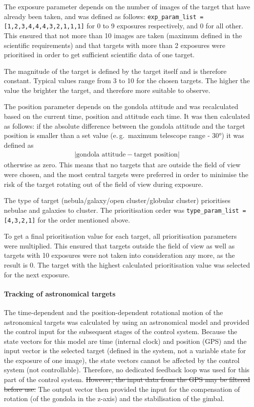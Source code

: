 The exposure parameter depends on the number of images of the target that have already been taken, and was defined as follows: \texttt{exp\_param\_list = [1,2,3,4,4,4,3,2,1,1,1]} for 0 to 9 exposures respectively, and 0 for all other. This ensured that not more than 10 images are taken (maximum defined in the scientific requirements) and that targets with more than 2 exposures were prioritised in order to get sufficient scientific data of one target.

The magnitude of the target is defined by the target itself and is therefore constant. Typical values range from 3 to 10 for the chosen targets. The higher the value the brighter the target, and therefore more suitable to observe.

The position parameter depends on the gondola attitude and was recalculated based on the current time, position and attitude each time. It was then calculated as follows: if the absolute difference between the gondola attitude and the target position is smaller than a set value (e.\,g.~maximum telescope range - $\ang{30}$) it was defined as 
\begin{align*}
	\left|\text{gondola attitude} - \text{target position} \right|
\end{align*}
otherwise as zero. This means that no targets that are outside the field of view were chosen, and the most central targets were preferred in order to minimise the risk of the target rotating out of the field of view during exposure.

The type of target (nebula/galaxy/open cluster/globular cluster) prioritises nebulae and galaxies to cluster. The prioritisation order was \texttt{type\_param\_list = [4,3,2,1]} for the order mentioned above.

To get a final prioritisation value for each target, all prioritisation parameters were multiplied. This ensured that targets outside the field of view as well as targets with 10 exposures were not taken into consideration any more, as the result is 0. The target with the highest calculated prioritisation value was selected for the next exposure.



\paragraph{Tracking of astronomical targets}

The time-dependent and the position-dependent rotational motion of the astronomical targets was calculated by using an astronomical model and provided the control input for the subsequent stages of the control system. Because the state vectors for this model are time (internal clock) and position (GPS) and the input vector is the selected target (defined in the system, not a variable state for the exposure of one image), the state vectors cannot be affected by the control system (not controllable). Therefore, no dedicated feedback loop was used for this part of the control system. \st{However, the input data from the GPS may be filtered before use.} The output vector then provided the input for the compensation of rotation (of the gondola in the z-axis) and the stabilisation of the gimbal.

